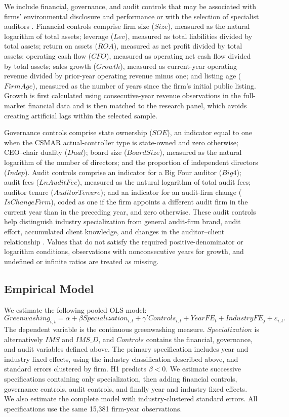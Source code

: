 \documentclass[11pt]{article}
\begin{document}
We include financial, governance, and audit controls that may be associated with firms' environmental disclosure and performance or with the selection of specialist auditors \citep{marquis2016scrutiny,reichelt2010national,defond2014review}. 
Financial controls comprise firm size (\(Size\)), measured as the natural logarithm of total assets; leverage (\(Lev\)), measured as total liabilities divided by total assets; 
return on assets (\(ROA\)), measured as net profit divided by total assets; operating cash flow (\(CFO\)), measured as operating net cash flow divided by total assets; 
sales growth (\(Growth\)), measured as current-year operating revenue divided by prior-year operating revenue minus one; 
and listing age (\(FirmAge\)), measured as the number of years since the firm's initial public listing. 
Growth is first calculated using consecutive-year revenue observations in the full-market financial data and is then matched to the research panel, 
which avoids creating artificial lags within the selected sample.

Governance controls comprise state ownership (\(SOE\)), an indicator equal to one when the CSMAR actual-controller type is state-owned and zero otherwise; 
CEO--chair duality (\(Dual\)); board size (\(BoardSize\)), measured as the natural logarithm of the number of directors; 
and the proportion of independent directors (\(Indep\)). 
Audit controls comprise an indicator for a Big Four auditor (\(Big4\)); audit fees (\(LnAuditFee\)), measured as the natural logarithm of total audit fees; 
auditor tenure (\(AuditorTenure\)); and an indicator for an audit-firm change (\(IsChangeFirm\)), coded as one if the firm appoints a different audit firm in the current year than in the preceding year, and zero otherwise. 
These audit controls help distinguish industry specialization from general audit-firm brand, audit effort, accumulated client knowledge, and changes in the auditor--client relationship \citep{defond2014review}. 
Values that do not satisfy the required positive-denominator or logarithm conditions, observations with nonconsecutive years for growth, and undefined or infinite ratios are treated as missing.

\subsection{Empirical Model}

We estimate the following pooled OLS model:
\[
Greenwashing_{i,t}=\alpha+\beta Specialization_{i,t}+\gamma'Controls_{i,t}+YearFE_t+IndustryFE_j+\varepsilon_{i,t}.
\]
The dependent variable is the continuous greenwashing measure. \(Specialization\) is alternatively \(IMS\) and \(IMS\_D\), and \(Controls\) contains the financial, governance, and audit variables defined above. The primary specification includes year and industry fixed effects, using the industry classification described above, and standard errors clustered by firm. H1 predicts \(\beta<0\). We estimate successive specifications containing only specialization, then adding financial controls, governance controls, audit controls, and finally year and industry fixed effects. We also estimate the complete model with industry-clustered standard errors. All specifications use the same 15,381 firm-year observations.
\end{document}
